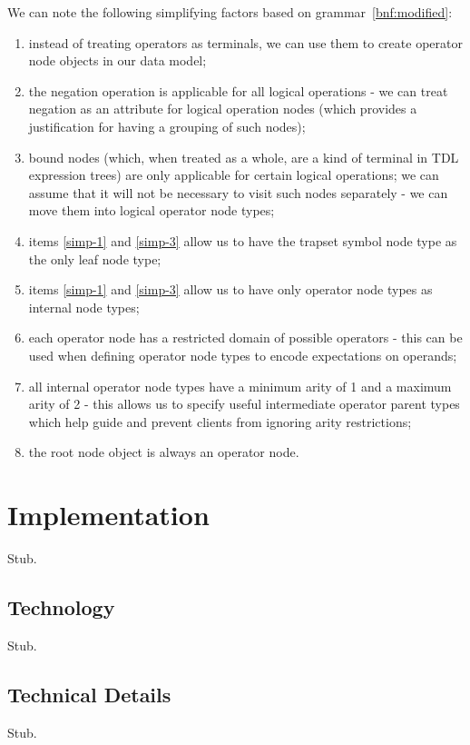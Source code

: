 \documentclass[12pt,oneside,a4paper,notitlepage]{report}
\begin{document}
	\par We can note the following simplifying factors based on grammar~\ref{bnf:modified}:
	\begin{enumerate}[label=\textbf{\arabic*.},ref=\textit{\arabic*.}]
		\item \label{simp-1} instead of treating operators as terminals, we can use them to create operator node objects in our data model;
		\item \label{simp-2} the negation operation is applicable for all logical operations - we can treat negation as an attribute for logical operation nodes (which provides a justification for having a grouping of such nodes);
		\item \label{simp-3} bound nodes (which, when treated as a whole, are a kind of terminal in TDL expression trees) are only applicable for certain logical operations; we can assume that it will not be necessary to visit such nodes separately - we can move them into logical operator node types;
		\item \label{simp-4} items \ref{simp-1} and \ref{simp-3} allow us to have the trapset symbol node type as the only leaf node type;
		\item \label{simp-5} items \ref{simp-1} and \ref{simp-3} allow us to have only operator node types as internal node types;
		\item \label{simp-6} each operator node has a restricted domain of possible operators - this can be used when defining operator node types to encode expectations on operands;
		\item \label{simp-7} all internal operator node types have a minimum arity of 1 and a maximum arity of 2 - this allows us to specify useful intermediate operator parent types which help guide and prevent clients from ignoring arity restrictions;
		\item \label{simp-8} the root node object is always an operator node.
	\end{enumerate}



	\section*{Implementation}
	\par Stub.

	\subsection*{Technology}
	\par Stub.

	\subsection*{Technical Details}
	\par Stub.

	\printbibliography[
		title=Sources
	]
\end{document}
